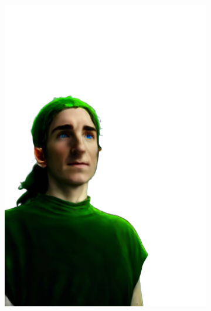 \begin{figure}[ht]
\begin{subfigure}{0.08\linewidth}
        \includegraphics[width=\textwidth]{Figures/results/high/irene_elf/11_render.png}

\end{subfigure}
\end{figure}
